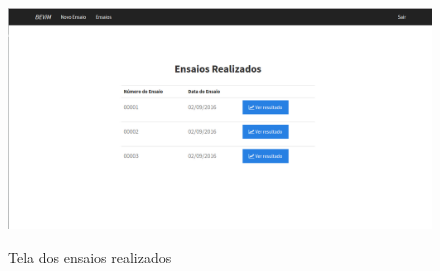 \begin{figure}[!h]    
\centering
\includegraphics[keepaspectratio=true,scale=0.40]{figuras/tela_ensaios.png}
\label{fig:tela_ensaios}	
\caption{Tela dos ensaios realizados}
\end{figure}
        